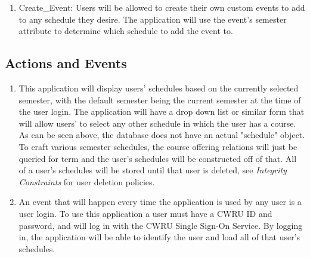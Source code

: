 \documentclass[pdftex,12pt,letter]{article}
\begin{document}
\begin{enumerate}[1.]
\item Create\_Event: Users will be allowed to create their own custom events to add to any schedule they desire. The application will use the event's semester attribute to determine which schedule to add the event to.
\end{enumerate}
\subsection{Actions and Events}
\begin{enumerate}[1.]
\item This application will display users' schedules based on the currently selected semester, with the default semester being the current semester at the time of the user login. The application will have a drop down list or similar form that will allow users' to select any other schedule in which the user has a course. As can be seen above, the database does not have an actual "schedule" object. To craft various semester schedules, the course offering relations will just be queried for term and the user's schedules will be constructed off of that. All of a user's schedules will be stored until that user is deleted, see \textit{Integrity Constraints} for user deletion policies.
\item An event that will happen every time the application is used by any user is a user login. To use this application a user must have a CWRU ID and password, and will log in with the CWRU Single Sign-On Service. By logging in, the application will be able to identify the user and load all of that user's schedules.
\end{enumerate}
\end{document}
